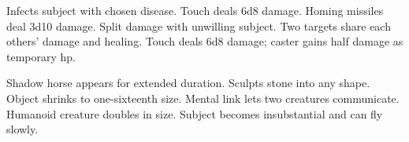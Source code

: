 \begin{swspelllist}
   Infects subject with chosen disease.
   Touch deals 6d8 damage.
   Homing missiles deal 3d10 damage.
   Split damage with unwilling subject.
   Two targets share each others' damage and healing.
   Touch deals 6d8 damage; caster gains half damage as temporary hp.

   Shadow horse appears for extended duration.
   Sculpts stone into any shape.
   Object shrinks to one-sixteenth size.
   Mental link lets two creatures communicate.
   Humanoid creature doubles in size.
   Subject becomes insubstantial and can fly slowly.
\end{swspelllist}

